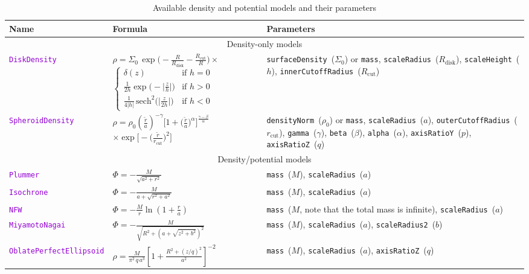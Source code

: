 \documentclass[12pt]{article}
\newcommand{\ttt}[1]{\textcolor{darkviolet}{\texttt{#1}}}
\newcommand{\ppp}[1]{\textcolor{darkolive} {\texttt{#1}}}
\begin{document}
\begin{table}
\caption{Available density and potential models and their parameters}  \label{tab:PotentialParams}
\begin{tabular}{l m{5cm} >{\raggedright\arraybackslash}m{6cm}}
Name & Formula & Parameters \\
\hline
\multicolumn{3}{c}{Density-only models} \\[2mm]
\ttt{DiskDensity} & $\rho = \Sigma_0\,\exp\big(-\frac{R}{R_\mathrm{disk}}-\frac{R_\mathrm{cut}}{R}\big)\times$
$\left\{ \begin{array}{ll} \delta(z) & \mbox{if } h=0 \\[1mm]
\frac{1}{2h} \exp\big(-\big|\frac{z}{h}\big|\big) & \mbox{if } h>0 \\[1mm]
\frac{1}{4|h|}\, \mathrm{sech}^2\big(\big|\frac{z}{2h}\big|\big) & \mbox{if } h<0 \end{array} \right. $ &
\ppp{surfaceDensity}~($\Sigma_0$) or \ppp{mass}, \ppp{scaleRadius}~($R_\mathrm{disk}$), \ppp{scaleHeight}~($h$), \ppp{innerCutoffRadius}~($R_\mathrm{cut}$)\\
\ttt{SpheroidDensity} & $\rho = \rho_0  \left(\frac{\tilde r}{a}\right)^{-\gamma} \Big[ 1 + \big(\frac{\tilde r}{a}\big)^\alpha \Big]^{\frac{\gamma-\beta}{\alpha}}$ $\times \exp\Big[ -\big(\frac{\tilde r}{r_\mathrm{cut}}\big)^2\Big] $ &
\ppp{densityNorm}~($\rho_0$) or \ppp{mass}, \ppp{scaleRadius}~($a$), \ppp{outerCutoffRadius}~($r_\mathrm{cut}$), \ppp{gamma}~($\gamma$), \ppp{beta}~($\beta$), \ppp{alpha}~($\alpha$), \ppp{axisRatioY}~($p$), \ppp{axisRatioZ}~($q$) \\[2mm]
\multicolumn{3}{c}{Density/potential models} \\[2mm]
\ttt{Plummer} & $\Phi = -\frac{M}{\sqrt{a^2+r^2}}$ & \ppp{mass}~($M$), \ppp{scaleRadius}~($a$) \\[2mm]
\ttt{Isochrone} & $\Phi = - \frac{M}{a + \sqrt{r^2 + a^2}}$ & \ppp{mass}~($M$), \ppp{scaleRadius}~($a$) \\[2mm]
\ttt{NFW} & $\Phi = -\frac{M}{r} \ln\left(1 + \frac{r}{a}\right)$ & \ppp{mass}~($M$, {\footnotesize note that the total mass is infinite}), \ppp{scaleRadius}~($a$) \\[2mm]
\ttt{MiyamotoNagai} & $\Phi = -\frac{M}{\sqrt{R^2 + \left(a + \sqrt{z^2+b^2}\right)^2}}$ & \ppp{mass}~($M$), \ppp{scaleRadius}~($a$), \ppp{scaleRadius2}~($b$) \\[2mm]
\ttt{OblatePerfectEllipsoid}\!\! & $\rho = \frac{M}{\pi^2\,q\,a^3} \left[ 1 + \frac{R^2+(z/q)^2}{a^2} \right]^{-2}$ &  \ppp{mass}~($M$), \ppp{scaleRadius}~($a$), \ppp{axisRatioZ}~($q$) \\[2mm]

\end{tabular}
\end{table}
\end{document}
